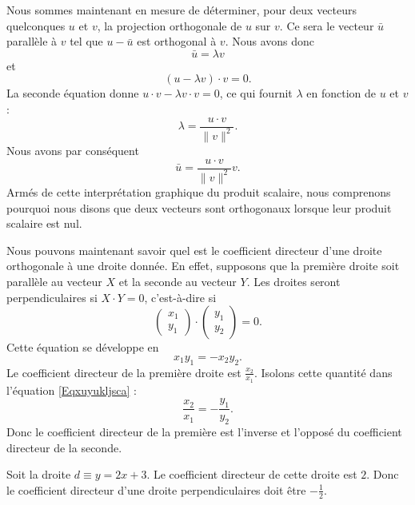 Nous sommes maintenant en mesure de déterminer, pour deux vecteurs quelconques $u$ et $v$, la projection orthogonale de $u$ sur $v$. Ce sera le vecteur $\bar u$ parallèle à $v$ tel que $u-\bar u$ est orthogonal à $v$. Nous avons donc
\begin{equation}
    \bar u=\lambda v
\end{equation}
et
\begin{equation}
    (u-\lambda v)\cdot v=0.
\end{equation}
La seconde équation donne $u\cdot v-\lambda v\cdot v=0$, ce qui fournit $\lambda$ en fonction de $u$ et $v$ :
\begin{equation}
    \lambda=\frac{ u\cdot v }{ \| v \|^2 }.
\end{equation}
Nous avons par conséquent
\begin{equation}
    \bar u=\frac{ u\cdot v }{ \| v \|^2 }v.
\end{equation}
Armés de cette interprétation graphique du produit scalaire, nous comprenons pourquoi nous disons que deux vecteurs sont orthogonaux lorsque leur produit scalaire est nul.

Nous pouvons maintenant savoir quel est le coefficient directeur d'une droite orthogonale à une droite donnée. En effet, supposons que la première droite soit parallèle au vecteur $X$ et la seconde au vecteur $Y$. Les droites seront perpendiculaires si $X\cdot Y=0$, c'est-à-dire si
\begin{equation}
	\begin{pmatrix}
		x_1	\\
		y_1
	\end{pmatrix}\cdot\begin{pmatrix}
		y_1	\\
		y_2
	\end{pmatrix}=0.
\end{equation}
Cette équation se développe en
\begin{equation}		\label{Eqxuyukljsca}
	x_1y_1=-x_2y_2.
\end{equation}
Le coefficient directeur de la première droite est $\frac{ x_2 }{ x_1 }$. Isolons cette quantité dans l'équation \eqref{Eqxuyukljsca} :
\begin{equation}
	\frac{ x_2 }{ x_1 }=-\frac{ y_1 }{ y_2 }.
\end{equation}
Donc le coefficient directeur de la première est l'inverse et l'opposé du coefficient directeur de la seconde.

\begin{example}
	Soit la droite $d\equiv y=2x+3$. Le coefficient directeur de cette droite est $2$. Donc le coefficient directeur d'une droite perpendiculaires doit être $-\frac{ 1 }{ 2 }$.
\end{example}

